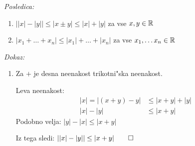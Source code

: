 \emph{Posledica:}
\begin{enumerate}[1)]
	\item $ \left||x| - |y|\right| \leq |x \pm y| \leq |x| + |y|$ za vse $x, y \in \mathbb{R}$
	\item $|x_1 + \ldots + x_n| \leq |x_1| + \ldots + |x_n|$ za vse $x_1, \ldots x_n \in \mathbb{R}$
\end{enumerate}
\emph{Dokaz:}
\begin{enumerate}[1)]
	\item Za $+$ je desna neenakost trikotni"ska neenakost.
	
	Leva neenakost:
	\begin{align*}
	|x| = |(x + y) - y| &\leq |x + y| + |y|\\
	|x| - |y| &\leq |x + y|
	\end{align*}
	Podobno velja: $|y| - |x| \leq |x + y|$
	
	Iz tega sledi: $||x| - |y|| \leq |x + y| \qed$
\end{enumerate}